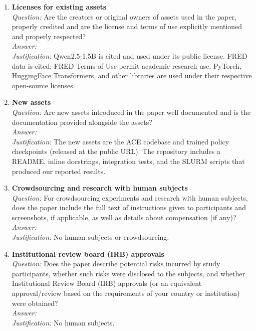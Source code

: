 \begin{enumerate}
\item \textbf{Licenses for existing assets}\\
\emph{Question:} Are the creators or original owners of assets used in the paper, properly credited and are the license and terms of use explicitly mentioned and properly respected?\\
\emph{Answer:} \answerYes{}\\
\emph{Justification:} Qwen2.5-1.5B is cited and used under its public license. FRED data is cited; FRED Terms of Use permit academic research use. PyTorch, HuggingFace Transformers, and other libraries are used under their respective open-source licenses.

\item \textbf{New assets}\\
\emph{Question:} Are new assets introduced in the paper well documented and is the documentation provided alongside the assets?\\
\emph{Answer:} \answerYes{}\\
\emph{Justification:} The new assets are the ACE codebase and trained policy checkpoints (released at the public URL). The repository includes a README, inline docstrings, integration tests, and the SLURM scripts that produced our reported results.

\item \textbf{Crowdsourcing and research with human subjects}\\
\emph{Question:} For crowdsourcing experiments and research with human subjects, does the paper include the full text of instructions given to participants and screenshots, if applicable, as well as details about compensation (if any)?\\
\emph{Answer:} \answerNA{}\\
\emph{Justification:} No human subjects or crowdsourcing.

\item \textbf{Institutional review board (IRB) approvals}\\
\emph{Question:} Does the paper describe potential risks incurred by study participants, whether such risks were disclosed to the subjects, and whether Institutional Review Board (IRB) approvals (or an equivalent approval/review based on the requirements of your country or institution) were obtained?\\
\emph{Answer:} \answerNA{}\\
\emph{Justification:} No human subjects.


\end{enumerate}
